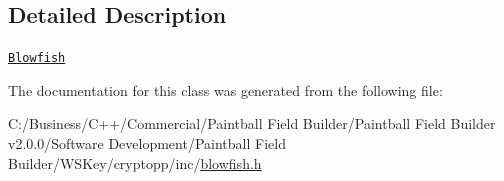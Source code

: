 \subsection{Detailed Description}
\href{http://www.weidai.com/scan-mirror/cs.html#Blowfish}{\tt Blowfish} 

The documentation for this class was generated from the following file:\begin{DoxyCompactItemize}
\item 
C:/Business/C++/Commercial/Paintball Field Builder/Paintball Field Builder v2.0.0/Software Development/Paintball Field Builder/WSKey/cryptopp/inc/\hyperlink{blowfish_8h}{blowfish.h}\end{DoxyCompactItemize}

